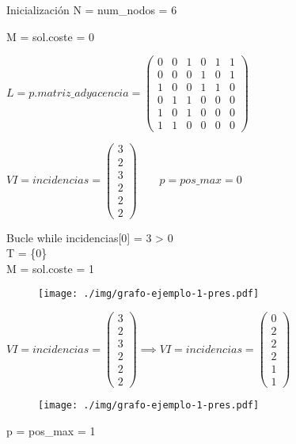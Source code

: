 \documentclass[spanish]{beamer}
\begin{document}
\begin{frame}{Inicialización}
	N = num\_nodos = 6

	M = sol.coste = 0


	$\displaystyle  L = p.matriz\_adyacencia =
\begin{pmatrix}
  0 & 0 & 1 & 0 & 1 & 1 \\
  0 & 0 & 0 & 1 & 0 & 1 \\
  1 & 0 & 0 & 1 & 1 & 0 \\
  0 & 1 & 1 & 0 & 0 & 0 \\
  1 & 0 & 1 & 0 & 0 & 0 \\
  1 & 1 & 0 & 0 & 0 & 0
\end{pmatrix}$

	$\displaystyle  VI = incidencias =
\begin{pmatrix}
  3 \\
  2 \\
  3 \\
  2 \\
  2 \\
  2
\end{pmatrix} \hspace{2em} p = pos\_max = 0$

\end{frame}

\begin{frame}{Bucle while}
	incidencias[0] = 3 > 0\\
	T = \{0\}\\
	M = sol.coste = 1
	\begin{figure}[H]
		\centering \texttt{[image: ./img/grafo-ejemplo-1-pres.pdf]}
	\end{figure}
\end{frame}

\begin{frame}{}
	$\displaystyle  VI = incidencias =
	\begin{pmatrix}
	  3 \\
	  2 \\
	  3 \\
	  2 \\
	  2 \\
	  2
	\end{pmatrix} \implies  VI = incidencias =
	\begin{pmatrix}
	  0 \\
	  2 \\
	  2 \\
	  2 \\
	  1 \\
	  1
	\end{pmatrix}$

	\begin{figure}[H]
		\centering \texttt{[image: ./img/grafo-ejemplo-1-pres.pdf]}
	\end{figure}
	p = pos\_max = 1

\end{frame}
\end{document}
